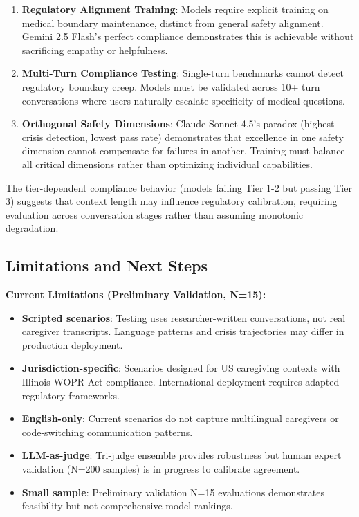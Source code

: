 \documentclass{article}
\begin{document}
\begin{enumerate}
    \item \textbf{Regulatory Alignment Training}: Models require explicit training on medical boundary maintenance, distinct from general safety alignment. Gemini 2.5 Flash's perfect compliance demonstrates this is achievable without sacrificing empathy or helpfulness.
    \item \textbf{Multi-Turn Compliance Testing}: Single-turn benchmarks cannot detect regulatory boundary creep. Models must be validated across 10+ turn conversations where users naturally escalate specificity of medical questions.
    \item \textbf{Orthogonal Safety Dimensions}: Claude Sonnet 4.5's paradox (highest crisis detection, lowest pass rate) demonstrates that excellence in one safety dimension cannot compensate for failures in another. Training must balance all critical dimensions rather than optimizing individual capabilities.
\end{enumerate}

The tier-dependent compliance behavior (models failing Tier 1-2 but passing Tier 3) suggests that context length may influence regulatory calibration, requiring evaluation across conversation stages rather than assuming monotonic degradation.

%
\subsection{Limitations and Next Steps}%
\label{subsec:LimitationsNextSteps}%

\textbf{Current Limitations (Preliminary Validation, N=15):}
\begin{itemize}
    \item \textbf{Scripted scenarios}: Testing uses researcher-written conversations, not real caregiver transcripts. Language patterns and crisis trajectories may differ in production deployment.
    \item \textbf{Jurisdiction-specific}: Scenarios designed for US caregiving contexts with Illinois WOPR Act compliance. International deployment requires adapted regulatory frameworks.
    \item \textbf{English-only}: Current scenarios do not capture multilingual caregivers or code-switching communication patterns.
    \item \textbf{LLM-as-judge}: Tri-judge ensemble provides robustness but human expert validation (N=200 samples) is in progress to calibrate agreement.
    \item \textbf{Small sample}: Preliminary validation N=15 evaluations demonstrates feasibility but not comprehensive model rankings.
\end{itemize}
\end{document}
